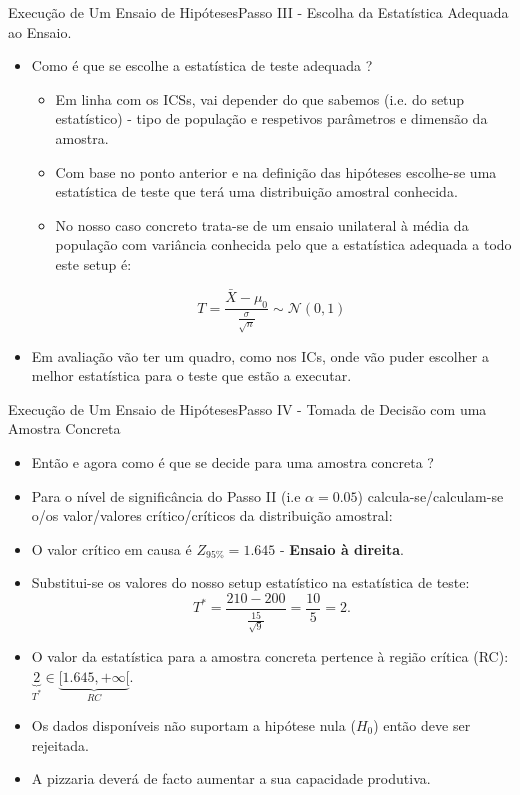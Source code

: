 \documentclass[10,5pt, pdf]{beamer}
\begin{document}
\begin{frame}{Execução de Um Ensaio de Hipóteses}{Passo III - Escolha da Estatística Adequada ao Ensaio.}
\begin{itemize}
    \item{Como é que se escolhe a estatística de teste adequada ?}
    \begin{itemize}
        \pause
        \item{Em linha com os ICSs, vai depender do que sabemos (i.e. do setup estatístico) - tipo de população e respetivos parâmetros e dimensão da amostra.}
        \pause
        \item{Com base no ponto anterior e na definição das hipóteses escolhe-se uma estatística de teste que terá uma distribuição amostral conhecida.}
        \pause
        \item{No nosso caso concreto trata-se de um ensaio unilateral à média da população com variância conhecida pelo que a estatística adequada a todo este setup é:}
    \end{itemize}
    \pause
    \begin{equation}
        T=\frac{\bar{X} - \mu_0}{\frac{\sigma}{\sqrt{n}}}\sim \mathcal{N}(0,1)
    \end{equation}
    \pause
\item{Em avaliação vão ter um quadro, como nos ICs, onde vão puder escolher a melhor estatística para o teste que estão a executar.}
\end{itemize}
\end{frame}

\begin{frame}{Execução de Um Ensaio de Hipóteses}{Passo IV - Tomada de Decisão com uma Amostra Concreta}
\begin{itemize}
    \item{Então e agora como é que se decide para uma amostra concreta ?}
    \pause
    \item{Para o nível de significância do Passo II (i.e $\alpha=0.05$) calcula-se/calculam-se o/os valor/valores crítico/críticos da distribuição amostral:}
    \pause
    \item{O valor crítico em causa é $Z_{95\%}=1.645$ - \textbf{Ensaio à direita}.}
    \pause
    \item{Substitui-se os valores do nosso setup estatístico na estatística de teste:}
    \begin{equation}
        T^*=\frac{210 -200}{\frac{15}{\sqrt{9}}}=\frac{10}{5}=2.
    \end{equation}
    \pause
\item{O valor da estatística para a amostra concreta pertence à região crítica (RC): $\underbrace{2}_{T^*}\in\underbrace{[1.645,+\infty[}_{RC}$.}
\pause
\item{Os dados disponíveis não suportam a hipótese nula ($H_0$) então deve ser rejeitada.}
\pause
\item{A pizzaria deverá de facto aumentar a sua capacidade produtiva.}
\end{itemize}
\end{frame}
\end{document}
